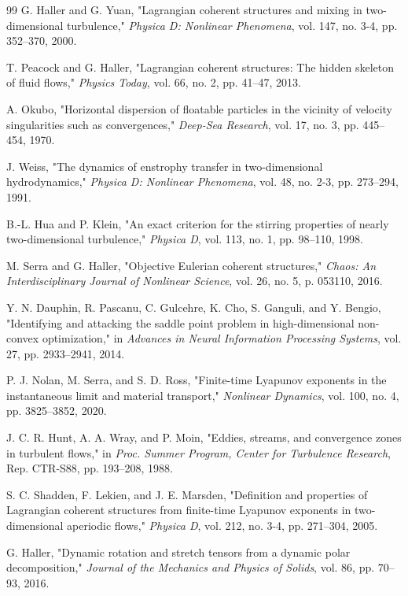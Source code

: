 \documentclass[12pt, letterpaper, oneside]{report}
\begin{document}
\begin{thebibliography}{99}
 G. Haller and G. Yuan, "Lagrangian coherent structures and mixing
in two-dimensional turbulence," \textit{Physica D: Nonlinear Phenomena},
vol. 147, no. 3-4, pp. 352--370, 2000.

 T. Peacock and G. Haller, "Lagrangian coherent structures: The
hidden skeleton of fluid flows," \textit{Physics Today}, vol. 66, no. 2,
pp. 41--47, 2013.

 A. Okubo, "Horizontal dispersion of floatable particles in the
vicinity of velocity singularities such as convergences," \textit{Deep-Sea
Research}, vol. 17, no. 3, pp. 445--454, 1970.

 J. Weiss, "The dynamics of enstrophy transfer in two-dimensional
hydrodynamics," \textit{Physica D: Nonlinear Phenomena}, vol. 48, no. 2-3,
pp. 273--294, 1991.

 B.-L. Hua and P. Klein, "An exact criterion for the stirring
properties of nearly two-dimensional turbulence," \textit{Physica D}, vol. 113,
no. 1, pp. 98--110, 1998.

 M. Serra and G. Haller, "Objective Eulerian coherent
structures," \textit{Chaos: An Interdisciplinary Journal of Nonlinear
Science}, vol. 26, no. 5, p. 053110, 2016.

 Y. N. Dauphin, R. Pascanu, C. Gulcehre, K. Cho, S. Ganguli,
and Y. Bengio, "Identifying and attacking the saddle point problem in
high-dimensional non-convex optimization," in \textit{Advances in Neural
Information Processing Systems}, vol. 27, pp. 2933--2941, 2014.

 P. J. Nolan, M. Serra, and S. D. Ross, "Finite-time Lyapunov
exponents in the instantaneous limit and material transport,"
\textit{Nonlinear Dynamics}, vol. 100, no. 4, pp. 3825--3852, 2020.

 J. C. R. Hunt, A. A. Wray, and P. Moin, "Eddies, streams, and
convergence zones in turbulent flows," in \textit{Proc. Summer Program,
Center for Turbulence Research}, Rep. CTR-S88, pp. 193--208, 1988.

 S. C. Shadden, F. Lekien, and J. E. Marsden, "Definition and
properties of Lagrangian coherent structures from finite-time Lyapunov
exponents in two-dimensional aperiodic flows," \textit{Physica D}, vol. 212,
no. 3-4, pp. 271--304, 2005.

 G. Haller, "Dynamic rotation and stretch tensors from a
dynamic polar decomposition," \textit{Journal of the Mechanics and Physics
of Solids}, vol. 86, pp. 70--93, 2016.


\end{thebibliography}
\end{document}
